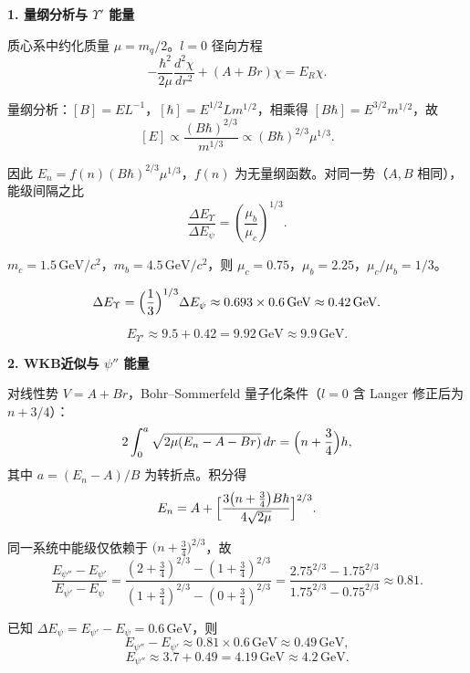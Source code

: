 \begin{derivationbox}[标准解题过程]
\textbf{1. 量纲分析与 $\Upsilon'$ 能量}

质心系中约化质量 $\mu=m_q/2$。$l=0$ 径向方程
\[
-\frac{\hbar^2}{2\mu}\frac{d^2\chi}{dr^2}+(A+Br)\chi=E_R\chi.
\]

量纲分析：$[B]=EL^{-1}$，$[\hbar]=E^{1/2}Lm^{1/2}$，相乘得 $[B\hbar]=E^{3/2}m^{1/2}$，故
\[
[E]\propto\frac{(B\hbar)^{2/3}}{m^{1/3}}\propto(B\hbar)^{2/3}\mu^{1/3}.
\]

因此 $E_n=f(n)(B\hbar)^{2/3}\mu^{1/3}$，$f(n)$ 为无量纲函数。对同一势（$A,B$ 相同），能级间隔之比
\[
\frac{\Delta E_\Upsilon}{\Delta E_\psi}=\left(\frac{\mu_b}{\mu_c}\right)^{1/3}.
\]

$m_c=1.5\,\text{GeV}/c^2$，$m_b=4.5\,\text{GeV}/c^2$，则 $\mu_c=0.75$，$\mu_b=2.25$，$\mu_c/\mu_b=1/3$。

\begin{equation}
\Delta E_\Upsilon=\Bigl(\frac13\Bigr)^{1/3}\Delta E_\psi\approx0.693\times0.6\,\text{GeV}\approx0.42\,\text{GeV}.
\end{equation}

\begin{equation}
\boxed{E_{\Upsilon'}\approx9.5+0.42=9.92\,\text{GeV}\approx9.9\,\text{GeV}.}
\end{equation}

\textbf{2. WKB近似与 $\psi''$ 能量}

对线性势 $V=A+Br$，Bohr--Sommerfeld 量子化条件（$l=0$ 含 Langer 修正后为 $n+3/4$）：
\[
2\int_0^a\sqrt{2\mu(E_n-A-Br)}\,dr=\Bigl(n+\frac34\Bigr)h,
\]
其中 $a=(E_n-A)/B$ 为转折点。积分得
\[
E_n=A+\Bigl[\frac{3\bigl(n+\frac34\bigr)B\hbar}{4\sqrt{2\mu}}\Bigr]^{2/3}.
\]

同一系统中能级仅依赖于 $\bigl(n+\frac34\bigr)^{2/3}$，故
\[
\frac{E_{\psi''}-E_{\psi'}}{E_{\psi'}-E_\psi}=\frac{(2+\frac34)^{2/3}-(1+\frac34)^{2/3}}{(1+\frac34)^{2/3}-(0+\frac34)^{2/3}}=\frac{2.75^{2/3}-1.75^{2/3}}{1.75^{2/3}-0.75^{2/3}}\approx0.81.
\]

已知 $\Delta E_\psi=E_{\psi'}-E_\psi=0.6\,\text{GeV}$，则
\begin{equation}
E_{\psi''}-E_{\psi'}\approx0.81\times0.6\,\text{GeV}\approx0.49\,\text{GeV},
\end{equation}
\begin{equation}
\boxed{E_{\psi''}\approx3.7+0.49=4.19\,\text{GeV}\approx4.2\,\text{GeV}.}
\end{equation}
\end{derivationbox}

